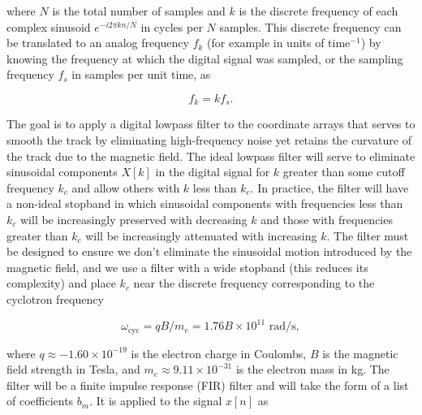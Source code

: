 \documentclass{JINST}
\begin{document}
\noindent where $N$ is the total number of samples and $k$ is the discrete frequency of each complex
sinusoid $e^{-i2\pi kn/N}$ in cycles per $N$ samples.  This discrete frequency can be translated to an analog
frequency $f_{k}$ (for example in units of time$^{-1}$) by knowing the frequency at which the digital signal was
sampled, or the sampling frequency $f_{s}$ in samples per unit time, as

\begin{equation}
f_{k} = kf_{s}.
\end{equation}

The goal is to apply a digital lowpass filter to the coordinate arrays that serves to
smooth the track by eliminating high-frequency noise yet retains the curvature of the track
due to the magnetic field.  The ideal lowpass filter will serve to eliminate sinusoidal components
$X[k]$ in the digital signal for $k$ greater than some cutoff frequency $k_{c}$ and allow 
others with $k$ less than $k_{c}$.  In practice, the filter will have a non-ideal stopband in which sinusoidal 
components with frequencies less than $k_{c}$ will be increasingly preserved with decreasing $k$ and those 
with frequencies greater than $k_{c}$ will be increasingly attenuated with increasing $k$.  The filter must be 
designed to ensure we don't eliminate the sinusoidal motion introduced by the magnetic field, and we use a
filter with a wide stopband (this reduces its complexity) and place $k_{c}$ near the discrete frequency 
corresponding to the cyclotron frequency


\begin{equation}\label{eqn_wcyc}
\omega_{\mathrm{cyc}} = qB/m_{e} = 1.76B \times 10^{11} \,\, \mathrm{rad/s},
\end{equation}

\noindent where $q \approx -1.60 \times 10^{-19}$ is the electron charge in Coulombs, $B$ is the magnetic field
strength in Tesla, and $m_{e} \approx 9.11 \times 10^{-31}$ is the electron mass in kg.  The filter will be a finite impulse
response (FIR) filter and will take the form of a  list of coefficients $b_{m}$.  It is applied to the signal $x[n]$ as
\end{document}
